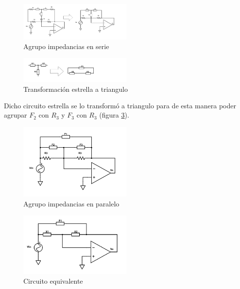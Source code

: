 \documentclass[../../tc_tp3_main.tex]{subfiles}
\begin{document}
\begin{figure}[H]
\centering
\includegraphics[width=0.5\textwidth]{imagenes/simpl2.png}
\caption{Agrupo impedancias en serie} \label{fig:cs2}
\end{figure}


\begin{figure}[H]
\centering
\includegraphics[width=0.5\textwidth]{imagenes/simpl3.png}
\caption{Transformación estrella a triangulo} \label{fig:cs3}
\end{figure}

Dicho circuito estrella se lo transformó a triangulo para de esta manera poder agrupar $F_2$ con $R_3$ y $F_3$ con $R_3$ (figura \ref{fig:cs4}).




\begin{figure}[H]
\centering
\includegraphics[width=0.5\textwidth]{imagenes/simpl4.png}
\caption{Agrupo impedancias en paralelo} \label{fig:cs4}
\end{figure}



\begin{figure}[H]
\centering
\includegraphics[width=0.5\textwidth]{imagenes/simplFin.png}
\caption{Circuito equivalente} \label{fig:csFin}
\end{figure}
\end{document}
